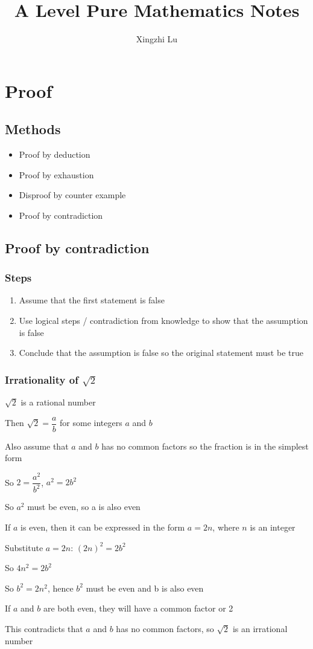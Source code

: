 \documentclass[A4paper]{article}
\title{A Level Pure Mathematics Notes}
\author{Xingzhi Lu}
\begin{document}
	\maketitle
	
	\section{Proof}
	\subsection{Methods}
	\begin{itemize}
		\item Proof by deduction
		\item Proof by exhaustion
		\item Disproof by counter example
		\item Proof by contradiction
	\end{itemize}
	\subsection{Proof by contradiction}
	\subsubsection{Steps}
	\begin{enumerate}
		\item Assume that the first statement is false
		\item Use logical steps / contradiction from knowledge to show that the assumption is false
		\item Conclude that the assumption is false so the original statement must be true
	\end{enumerate}
	\subsubsection{Irrationality of $\sqrt{2}$}
	\begin{description}
		\item [Assumption:] $\sqrt{2}$ is a rational number
		\item Then $\sqrt{2} = \dfrac{a}{b}$ for some integers $a$ and $b$
		\item Also assume that $a$ and $b$ has no common factors so the fraction is in the simplest form
		\item So $2=\dfrac{a^2}{b^2}$, $a^2=2b^2$
		\item So $a^2$ must be even, so a is also even
		\item If $a$ is even, then it can be expressed in the form $a=2n$, where $n$ is an integer
		\item Substitute $a=2n$: $(2n)^2=2b^2$
		\item So $4n^2 = 2b^2$
		\item So $b^2=2n^2$, hence $b^2$ must be even and b is also even
		\item If $a$ and $b$ are both even, they will have a common factor or 2
		\item This contradicts that $a$ and $b$ has no common factors, so $\sqrt{2}$ is an irrational number
	\end{description}
\end{document}
